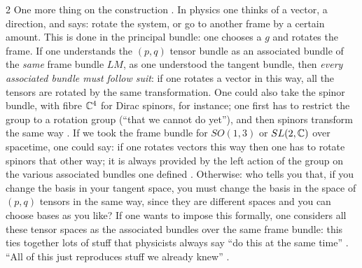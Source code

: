 \begin{paracol}{2}
One more thing on the construction . In physics one thinks of a vector, a direction, and says: rotate the system, or go to another frame by a certain amount. This is done in the principal bundle: one chooses a $g$ and rotates the frame. If one understands the $(p,q)$ tensor bundle as an associated bundle of the \emph{same} frame bundle $LM$, as one understood the tangent bundle, then \emph{every associated bundle must follow suit}: if one rotates a vector in this way, all the tensors are rotated by the same transformation. One could also take the spinor bundle, with fibre $\mathbb{C}^4$ for Dirac spinors, for instance; one first has to restrict the group to a rotation group (``that we cannot do yet''), and then spinors transform the same way    . If we took the frame bundle for $SO(1,3)$ or $SL(2,\mathbb{C})$ over spacetime, one could say: if one rotates vectors this way then one has to rotate spinors that other way; it is always provided by the left action of the group on the various associated bundles one defined  . Otherwise: who tells you that, if you change the basis in your tangent space, you must change the basis in the space of $(p,q)$ tensors in the same way, since they are different spaces and you can choose bases as you like? If one wants to impose this formally, one considers all these tensor spaces as the associated bundles over the same frame bundle: this ties together lots of stuff that physicists always say ``do this at the same time''   . ``All of this just reproduces stuff we already knew''  .


\end{paracol}
